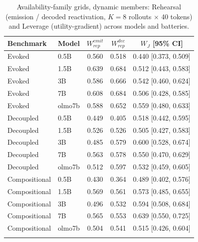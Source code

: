 \begin{table}[h]
\centering
\caption{Availability-family grids, dynamic members: Rehearsal (emission /
decoded reactivation, $K{=}8$ rollouts $\times$ 40 tokens) and Leverage
(utility-gradient) across models and batteries.}
\label{tab:appA7}
\small
\begin{tabular}{llcc>{\columncolor{wsRow}}c}
\toprule
Benchmark & Model & $W_{rep}^{emit}$ & $W_{rep}^{dec}$ & $W_J$ [95\% CI] \\
\midrule
Evoked & 0.5B & 0.560 & 0.518 & 0.440 [0.373, 0.509] \\
Evoked & 1.5B & 0.639 & 0.684 & 0.512 [0.443, 0.583] \\
Evoked & 3B & 0.586 & 0.666 & 0.542 [0.460, 0.624] \\
Evoked & 7B & 0.608 & 0.684 & 0.506 [0.428, 0.585] \\
Evoked & olmo7b & 0.588 & 0.652 & 0.559 [0.480, 0.633] \\
\addlinespace
Decoupled & 0.5B & 0.449 & 0.405 & 0.518 [0.442, 0.595] \\
Decoupled & 1.5B & 0.526 & 0.526 & 0.505 [0.427, 0.583] \\
Decoupled & 3B & 0.485 & 0.579 & 0.600 [0.528, 0.674] \\
Decoupled & 7B & 0.563 & 0.578 & 0.550 [0.470, 0.629] \\
Decoupled & olmo7b & 0.512 & 0.597 & 0.532 [0.459, 0.605] \\
\addlinespace
Compositional & 0.5B & 0.430 & 0.364 & 0.489 [0.402, 0.576] \\
Compositional & 1.5B & 0.569 & 0.561 & 0.573 [0.485, 0.655] \\
Compositional & 3B & 0.496 & 0.532 & 0.594 [0.508, 0.684] \\
Compositional & 7B & 0.565 & 0.553 & 0.639 [0.550, 0.725] \\
Compositional & olmo7b & 0.504 & 0.541 & 0.515 [0.426, 0.604] \\
\addlinespace
\bottomrule
\end{tabular}
\end{table}
